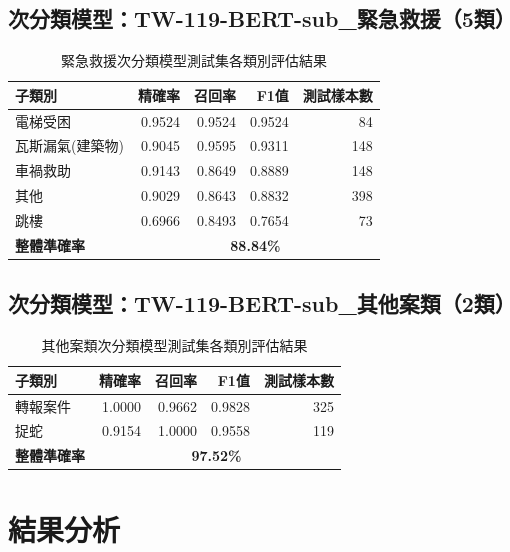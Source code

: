 \documentclass[UTF8,a4paper,11pt]{ctexart}
\begin{document}
\subsection{次分類模型：TW-119-BERT-sub\_緊急救援（5類）}

\begin{table}[htbp]
  \centering
  \caption{緊急救援次分類模型測試集各類別評估結果}
  \label{tab:sub-jinji}
  \begin{tabular}{lrrrr}
    \toprule
    子類別 & 精確率 & 召回率 & F1值 & 測試樣本數 \\
    \midrule
    電梯受困         & 0.9524 & 0.9524 & 0.9524 &  84 \\
    瓦斯漏氣(建築物) & 0.9045 & 0.9595 & 0.9311 & 148 \\
    車禍救助         & 0.9143 & 0.8649 & 0.8889 & 148 \\
    其他             & 0.9029 & 0.8643 & 0.8832 & 398 \\
    跳樓             & 0.6966 & 0.8493 & 0.7654 &  73 \\
    \midrule
    \textbf{整體準確率} & \multicolumn{4}{c}{\textbf{88.84\%}} \\
    \bottomrule
  \end{tabular}
\end{table}

\subsection{次分類模型：TW-119-BERT-sub\_其他案類（2類）}

\begin{table}[htbp]
  \centering
  \caption{其他案類次分類模型測試集各類別評估結果}
  \label{tab:sub-qita}
  \begin{tabular}{lrrrr}
    \toprule
    子類別 & 精確率 & 召回率 & F1值 & 測試樣本數 \\
    \midrule
    轉報案件 & 1.0000 & 0.9662 & 0.9828 & 325 \\
    捉蛇     & 0.9154 & 1.0000 & 0.9558 & 119 \\
    \midrule
    \textbf{整體準確率} & \multicolumn{4}{c}{\textbf{97.52\%}} \\
    \bottomrule
  \end{tabular}
\end{table}

\section{結果分析}
\end{document}
